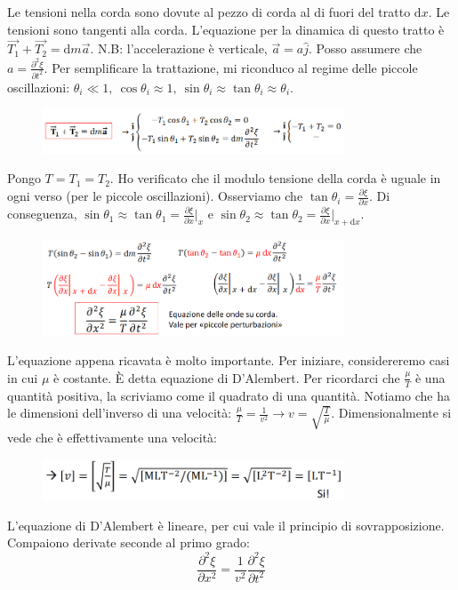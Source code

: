 Le tensioni nella corda sono dovute al pezzo di corda al di fuori del tratto \(\mathrm{d}x \). Le tensioni sono tangenti alla corda. L'equazione per la dinamica di questo tratto è \(\vec{T_1} +\vec{T_2} = \mathrm{d}m \vec{a} \). N.B: l'accelerazione è verticale, \(\vec{a} = a \hat{j} \). Posso assumere che \(a=\frac{\partial ^{2} \xi }{\partial t^{2} } \). Per semplificare la trattazione, mi riconduco al regime delle piccole oscillazioni: \(\theta _i \ll  1,\ \cos \theta _i \approx 1,\ \sin \theta _i \approx \tan \theta _i \approx \theta _i \).

\begin{figure}[H]
	\centering
	\includegraphics[width=0.8\textwidth]{2024-03-07-10-41-03.png}
\end{figure}

Pongo \(T=T_1=T_2\). Ho verificato che il modulo tensione della corda è uguale in ogni verso (per le piccole oscillazioni). Osserviamo che \(\tan \theta _i = \frac{\partial \xi}{\partial x} \). Di conseguenza, \(\sin \theta _1 \approx \tan \theta _1= \frac{\partial \xi }{\partial x} \vert_x \) e \(\sin \theta _2 \approx \tan \theta _2 = \frac{\partial \xi }{\partial x}\vert_{x+\mathrm{d}x }  \).

\begin{figure}[H]
	\centering
	\includegraphics[width=0.8\textwidth]{2024-03-07-10-47-36.png}
\end{figure}

L'equazione appena ricavata è molto importante. Per iniziare, considereremo casi in cui \(\mu \) è costante. È detta equazione di D'Alembert. Per ricordarci che \(\frac{\mu }{T}\) è una quantità positiva, la scriviamo come il quadrato di una quantità. Notiamo che ha le dimensioni dell'inverso di una velocità: \(\frac{\mu }{T} = \frac{1}{v^{2} } \to v=\sqrt{\frac{T}{\mu }} \). Dimensionalmente si vede che è effettivamente una velocità:
\begin{figure}[H]
	\centering
	\includegraphics[width=0.8\textwidth]{2024-03-07-10-54-11.png}
\end{figure}
L'equazione di D'Alembert è lineare, per cui vale il principio di sovrapposizione. Compaiono derivate seconde al primo grado:
\begin{equation}
	\label{eq:dalembert_1d}
	\frac{\partial^{2}  \xi }{\partial x^{2} } = \frac{1}{v^{2} }\frac{\partial ^{2} \xi }{\partial t^{2} } 
\end{equation}